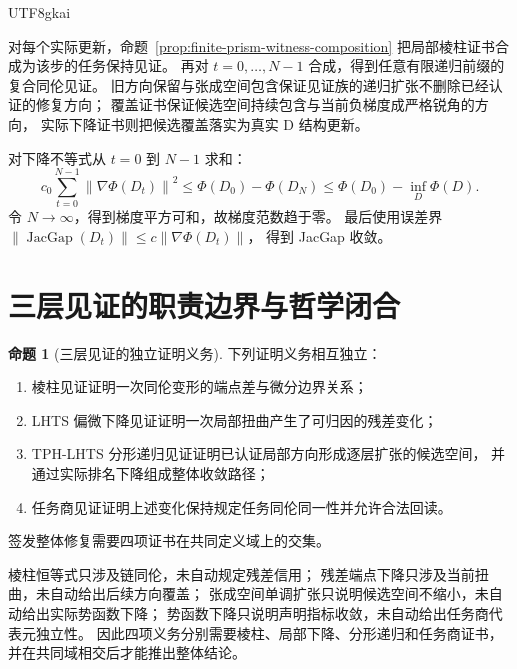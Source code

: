 \documentclass[12pt]{report}
\makeatletter
\theoremstyle{definition}
\newtheorem{proposition}{命题}[chapter]
\renewenvironment{proof}[1][\proofname]{\par
  \pushQED{\qed}\normalfont
  \topsep6\p@\@plus6\p@\relax
  \trivlist
  \item[\hskip\labelsep\normalfont #1\@addpunct{.}]\ignorespaces
}{
  \popQED\endtrivlist\@endpefalse
}
\newcommand{\JacGap}{\operatorname{JacGap}}
\newcommand{\norm}[1]{\left\lVert#1\right\rVert}
\makeatother
\begin{document}
\begin{CJK*}{UTF8}{gkai}
\begin{proof}
对每个实际更新，命题~\ref{prop:finite-prism-witness-composition}
把局部棱柱证书合成为该步的任务保持见证。
再对 \(t=0,\ldots,N-1\) 合成，得到任意有限递归前缀的复合同伦见证。
旧方向保留与张成空间包含保证见证族的递归扩张不删除已经认证的修复方向；
覆盖证书保证候选空间持续包含与当前负梯度成严格锐角的方向，
实际下降证书则把候选覆盖落实为真实 D 结构更新。

对下降不等式从 \(t=0\) 到 \(N-1\) 求和：
\[
c_0\sum_{t=0}^{N-1}\norm{\nabla\Phi(D_t)}^2
\le
\Phi(D_0)-\Phi(D_N)
\le
\Phi(D_0)-\inf_D\Phi(D).
\]
令 \(N\to\infty\)，得到梯度平方可和，故梯度范数趋于零。
最后使用误差界
\(\norm{\JacGap(D_t)}
\le c\norm{\nabla\Phi(D_t)}\)，
得到 JacGap 收敛。
\end{proof}

\section{三层见证的职责边界与哲学闭合}

\begin{proposition}[三层见证的独立证明义务]
\label{prop:three-witness-obligations}
下列证明义务相互独立：
\begin{enumerate}
\item 棱柱见证证明一次同伦变形的端点差与微分边界关系；
\item LHTS 偏微下降见证证明一次局部扭曲产生了可归因的残差变化；
\item TPH-LHTS 分形递归见证证明已认证局部方向形成逐层扩张的候选空间，
      并通过实际排名下降组成整体收敛路径；
\item 任务商见证证明上述变化保持规定任务同伦同一性并允许合法回读。
\end{enumerate}
签发整体修复需要四项证书在共同定义域上的交集。
\end{proposition}

\begin{proof}
棱柱恒等式只涉及链同伦，未自动规定残差信用；
残差端点下降只涉及当前扭曲，未自动给出后续方向覆盖；
张成空间单调扩张只说明候选空间不缩小，未自动给出实际势函数下降；
势函数下降只说明声明指标收敛，未自动给出任务商代表元独立性。
因此四项义务分别需要棱柱、局部下降、分形递归和任务商证书，
并在共同域相交后才能推出整体结论。
\end{proof}


\end{CJK*}
\end{document}
